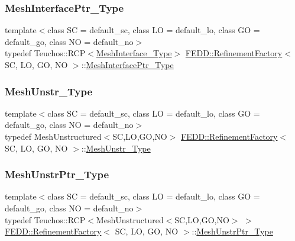 \subsubsection{\texorpdfstring{Mesh\+Interface\+Ptr\+\_\+\+Type}{MeshInterfacePtr\_Type}}
{\footnotesize\ttfamily template$<$class SC = default\+\_\+sc, class LO = default\+\_\+lo, class GO = default\+\_\+go, class NO = default\+\_\+no$>$ \\
typedef Teuchos\+::\+R\+CP$<$\hyperlink{classFEDD_1_1RefinementFactory_aff8bb4cd3896a419c36d4baabccbf28a}{Mesh\+Interface\+\_\+\+Type}$>$ \hyperlink{classFEDD_1_1RefinementFactory}{F\+E\+D\+D\+::\+Refinement\+Factory}$<$ SC, LO, GO, NO $>$\+::\hyperlink{classFEDD_1_1RefinementFactory_a2217802fcbb1342b135d33ea70411089}{Mesh\+Interface\+Ptr\+\_\+\+Type}}

\mbox{\label{classFEDD_1_1RefinementFactory_af03eee08be24542da73ba33195f14aba}} 
\subsubsection{\texorpdfstring{Mesh\+Unstr\+\_\+\+Type}{MeshUnstr\_Type}}
{\footnotesize\ttfamily template$<$class SC = default\+\_\+sc, class LO = default\+\_\+lo, class GO = default\+\_\+go, class NO = default\+\_\+no$>$ \\
typedef Mesh\+Unstructured$<$SC,LO,GO,NO$>$ \hyperlink{classFEDD_1_1RefinementFactory}{F\+E\+D\+D\+::\+Refinement\+Factory}$<$ SC, LO, GO, NO $>$\+::\hyperlink{classFEDD_1_1RefinementFactory_af03eee08be24542da73ba33195f14aba}{Mesh\+Unstr\+\_\+\+Type}}

\mbox{\label{classFEDD_1_1RefinementFactory_a1a278d01c278972af01f2996247af8ac}} 
\subsubsection{\texorpdfstring{Mesh\+Unstr\+Ptr\+\_\+\+Type}{MeshUnstrPtr\_Type}}
{\footnotesize\ttfamily template$<$class SC = default\+\_\+sc, class LO = default\+\_\+lo, class GO = default\+\_\+go, class NO = default\+\_\+no$>$ \\
typedef Teuchos\+::\+R\+CP$<$Mesh\+Unstructured$<$SC,LO,GO,NO$>$ $>$ \hyperlink{classFEDD_1_1RefinementFactory}{F\+E\+D\+D\+::\+Refinement\+Factory}$<$ SC, LO, GO, NO $>$\+::\hyperlink{classFEDD_1_1RefinementFactory_a1a278d01c278972af01f2996247af8ac}{Mesh\+Unstr\+Ptr\+\_\+\+Type}}

